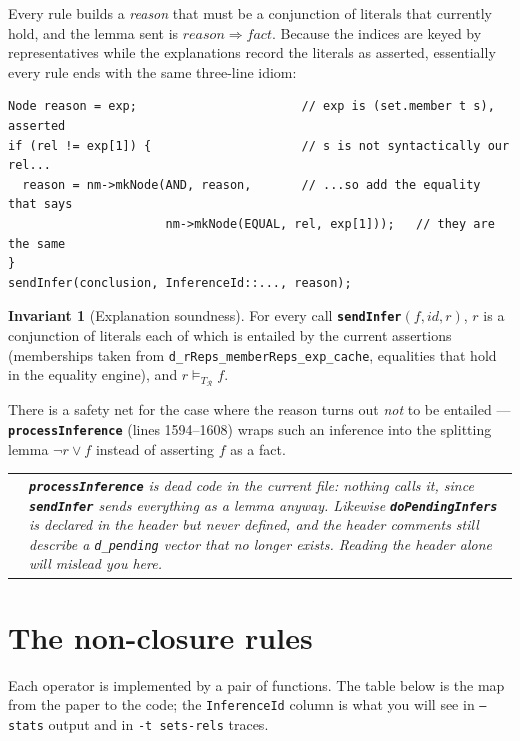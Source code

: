 \documentclass[11pt,a4paper]{article}
\makeatletter
\newcommand{\code}[1]{\texttt{\small #1}}
\newcommand{\fn}[1]{\texttt{\small\bfseries #1}}
\newcommand{\TR}{T_{\mathcal{R}}}
\theoremstyle{definition}
\newtheorem{invariant}{Invariant}
\newenvironment{sidenote}
  {\par\medskip\noindent\begin{tabular}{@{}p{0.02\textwidth}@{\hspace{4pt}}p{0.93\textwidth}@{}}
   \raisebox{-1pt}{\color{hl}\Large$\vartriangleright$} &\itshape}
  {\end{tabular}\par\medskip}
\makeatother
\begin{document}
\noindent
Every rule builds a \emph{reason} that must be a conjunction of literals that
currently hold, and the lemma sent is $\mathit{reason}\Rightarrow
\mathit{fact}$. Because the indices are keyed by representatives while the
explanations record the literals as asserted, essentially every rule ends with
the same three-line idiom:

\begin{lstlisting}
Node reason = exp;                       // exp is (set.member t s), asserted
if (rel != exp[1]) {                     // s is not syntactically our rel...
  reason = nm->mkNode(AND, reason,       // ...so add the equality that says
                      nm->mkNode(EQUAL, rel, exp[1]));   // they are the same
}
sendInfer(conclusion, InferenceId::..., reason);
\end{lstlisting}

\begin{invariant}[Explanation soundness]\label{inv:exp}
For every call \fn{sendInfer}$(f,\mathit{id},r)$, $r$ is a conjunction of
literals each of which is entailed by the current assertions (memberships taken
from \code{d\_rReps\_\allowbreak{}memberReps\_\allowbreak{}exp\_cache}, equalities that hold in the
equality engine), and $r \models_{\TR} f$.
\end{invariant}

\noindent
There is a safety net for the case where the reason turns out \emph{not} to be
entailed --- \fn{processInference} (lines 1594--1608) wraps such an inference
into the splitting lemma $\neg r \vee f$ instead of asserting $f$ as a fact.

\begin{sidenote}
\fn{processInference} is dead code in the current file: nothing calls it, since
\fn{sendInfer} sends everything as a lemma anyway. Likewise
\fn{doPendingInfers} is declared in the header but never defined, and the
header comments still describe a \code{d\_pending} vector that no longer
exists. Reading the header alone will mislead you here.
\end{sidenote}

\section{The non-closure rules}\label{sec:otherrules}

Each operator is implemented by a pair of functions. The table below is the
map from the paper to the code; the \code{InferenceId} column is what you will
see in \code{--stats} output and in \code{-t sets-rels} traces.
\end{document}
